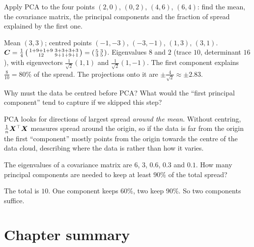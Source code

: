 \sectionexercises

\begin{exercise}
Apply PCA to the four points $(2, 0)$, $(0, 2)$, $(4, 6)$, $(6, 4)$: find the
mean, the covariance matrix, the principal components and the fraction of
spread explained by the first one.
\end{exercise}
\begin{solution}
Mean $(3, 3)$; centred points $(-1, -3)$, $(-3, -1)$, $(1, 3)$, $(3, 1)$.
$\bm{C} = \tfrac14\left(\begin{smallmatrix} 1 + 9 + 1 + 9 & 3 + 3 + 3 + 3\\ 12 & 9
+ 1 + 9 + 1\end{smallmatrix}\right) = \left(\begin{smallmatrix} 5 & 3\\ 3 &
5\end{smallmatrix}\right)$. Eigenvalues $8$ and $2$ (trace $10$, determinant
$16$), with eigenvectors $\tfrac{1}{\sqrt2}(1, 1)$ and $\tfrac{1}{\sqrt2}(1,
-1)$. The first component explains $\tfrac{8}{10} = 80\%$ of the spread. The
projections onto it are $\pm\tfrac{4}{\sqrt2} \approx \pm2.83$.
\end{solution}

\begin{exercise}
Why must the data be centred before PCA? What would the ``first principal
component'' tend to capture if we skipped this step?
\end{exercise}
\begin{solution}
PCA looks for directions of largest spread \emph{around the mean}. Without
centring, $\frac1n\bm{X}^\top\bm{X}$ measures spread around the origin, so if the data
is far from the origin the first ``component'' mostly points from the origin
towards the centre of the data cloud, describing where the data is rather than
how it varies.
\end{solution}

\begin{exercise}
The eigenvalues of a covariance matrix are $6$, $3$, $0.6$, $0.3$ and $0.1$.
How many principal components are needed to keep at least $90\%$ of the total
spread?
\end{exercise}
\begin{solution}
The total is $10$. One component keeps $60\%$, two keep $90\%$. So two
components suffice.
\end{solution}

\section{Chapter summary}\label{sec:ch5-summary}

